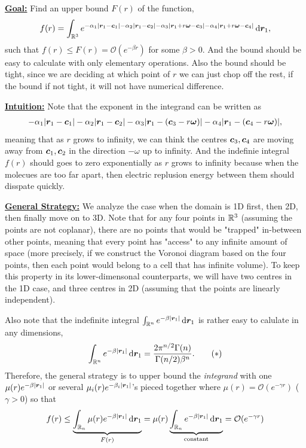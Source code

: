 \documentclass[12pt]{article}
\begin{document}
\underline{\textbf{Goal:}} Find an upper bound \(F(r)\) of the function,
\begin{align*}
    f(r) = \int_{\mathbb {R}^3} e^{-\alpha_1|\bm{r}_1 - \bm{c}_1| - \alpha_2|\bm{r}_1 - \bm{c}_2|-\alpha_3|\bm{r}_1 + r\bm{\omega} - \bm{c}_3|-\alpha_4|\bm{r}_1 + r\bm{\omega} - \bm{c}_4|} \mathop{}\!\mathrm{d} \bm{r}_1,
\end{align*}
such that \(f(r) \leq F(r) = \mathcal{O}(e^{-\beta r})\) for some \(\beta > 0\). And the bound should be easy to calculate with only elementary operations. Also the bound should be tight, since we are deciding at which point of \(r\) we can just chop off the rest, if the bound if not tight, it will not have numerical difference.

\underline{\textbf{Intuition:}} Note that the exponent in the integrand can be written as 
\begin{align*}
    -\alpha_1|\bm{r}_1 - \bm{c}_1| - \alpha_2|\bm{r}_1 - \bm{c}_2|-\alpha_3|\bm{r}_1 - (\bm{c}_3-r\bm{\omega})|-\alpha_4|\bm{r}_1 - (\bm{c}_4 - r\bm{\omega})|,
\end{align*} 
meaning that as \(r\) grows to infinity, we can think the centres \(\bm{c}_3, \bm{c}_4\) are moving away from \(\bm{c}_1, \bm{c}_2\) in the direction \(-\omega\) up to infinity. And the indefinie integral \(f(r)\) should goes to zero exponentially as \(r\) grows to infinity because when the molecues are too far apart, then electric replusion energy between them should disspate quickly.

\underline{\textbf{General Strategy:}} 
We analyze the case when the domain is 1D first, then 2D, then finally move on to 3D. 
Note that for any four points in \(\mathbb {R}^3\) (assuming the points are not coplanar), there are no points that would be "trapped" in-between other points, meaning that every point has "access" to any infinite amount of space (more precisely, if we construct the Voronoi diagram based on the four points, then each point would belong to a cell that has infinite volume).
To keep this property in its lower-dimensonal counterparts, we will have two centres in the 1D case, and three centres in 2D (assuming that the points are linearly independent).

Also note that the indefinite integral \(\int_{\mathbb {R}^n} e^{-\beta |\bm{r}_1|} \mathop{}\!\mathrm{d} \bm{r}_1\) is rather easy to calulate in any dimensions,
\begin{align*}
    \int_{\mathbb {R}^n} e^{-\beta |\bm{r}_1|} \mathop{}\!\mathrm{d} \bm{r}_1 = \frac{2 \pi^{n/2}\Gamma(n)}{\Gamma(n/2) \beta^n}. \tag{\(\ast\)}
\end{align*}
Therefore, the general strategy is to upper bound the \textit{integrand} with one \(\mu(r)e^{-\beta|\bm{r}_1|}\) or several \(\mu_i(r)e^{-\beta_i|\bm{r}_1|}\)'s pieced together where \(\mu(r) = \mathcal{O}(e^{-\gamma r})\) (\(\gamma > 0\)) so that
\begin{align*}
    f(r) 
    \leq 
    \underbrace{\int_{\mathbb {R}_n} \mu(r) e^{-\beta|\bm{r}_1|} \mathop{}\!\mathrm{d} \bm{r}_1}_{F(r)}
    =
    \mu(r) \underbrace{\int_{\mathbb {R}_n}  e^{-\beta|\bm{r}_1|} \mathop{}\!\mathrm{d} \bm{r}_1}_{\text{constant}}
    = \mathcal{O}(e^{-\gamma r})
\end{align*}
\end{document}
